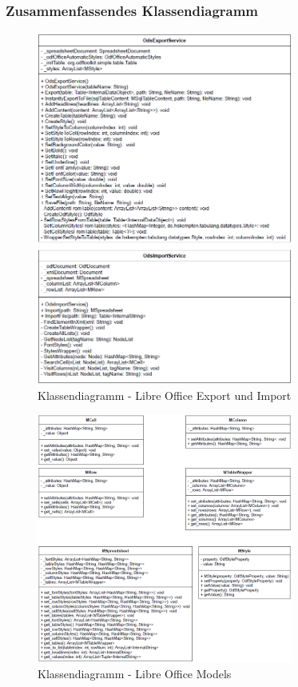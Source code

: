 \subsubsection{Zusammenfassendes Klassendiagramm}
\label{loClasses}
\begin{figure}[h]
\centering
\includegraphics[width=0.75\textwidth]{"images/ods.png"}
\caption{Klassendiagramm - Libre Office Export und Import}
\end{figure}
\newpage
\begin{figure}[h]
\centering
\includegraphics[width=0.75\textwidth]{"images/ods-models.png"}
\caption{Klassendiagramm - Libre Office Models}
\end{figure}